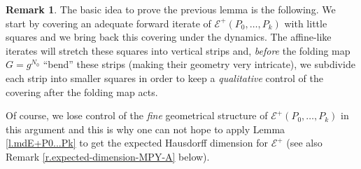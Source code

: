 \documentclass[12pt]{amsart}
\numberwithin{equation}{section}
\theoremstyle{definition}
\newtheorem{remark}[theorem]{Remark}
\newcommand{\<}{{\langle}}
\renewcommand{\>}{{\rangle}}
\begin{document}
\begin{remark}\label{r.MPY-A-idea} The basic idea to prove the previous lemma is the following. We start by covering an adequate forward iterate of $\mathcal{E}^+(P_0,\dots,P_k)$ with little squares and we bring back this covering under the dynamics. The affine-like iterates will stretch these squares into vertical strips and, \emph{before} the folding map $G=g^{N_0}$ ``bend'' these strips (making their geometry very intricate), we subdivide each strip into smaller squares in order to keep a \emph{qualitative} control of the covering after the folding map acts. 

Of course, we lose control of the \emph{fine} geometrical structure of $\mathcal{E}^+(P_0,\dots,P_k)$ in this argument and this is why one can not hope to apply Lemma \ref{l.mdE+P0...Pk} to get the expected Hausdorff dimension for $\mathcal{E}^+$ (see also Remark \ref{r.expected-dimension-MPY-A} below).  %
\end{remark}


\end{document}
